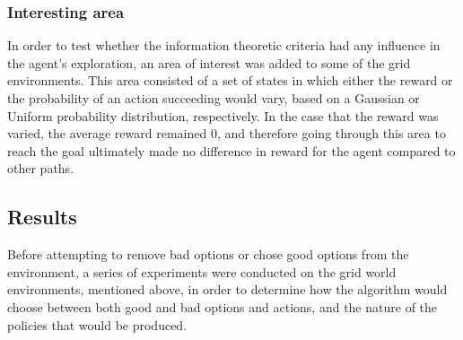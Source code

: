 \documentclass{acm_proc_article-sp}
\begin{document}


\subsubsection{Interesting area}

In order to test whether the information theoretic criteria had any influence in the agent's exploration, an area of interest was added to some of the grid environments. This area consisted of a set of states in which either the reward or the probability of an action succeeding would vary, based on a Gaussian or Uniform probability distribution, respectively. In the case that the reward was varied, the average reward remained 0, and therefore going through this area to reach the goal ultimately made no difference in reward for the agent compared to other paths.


\subsection{Results}

Before attempting to remove bad options or chose good options from the environment, a series of experiments were conducted on the grid world environments, mentioned above, in order to determine how the algorithm would choose between both good and bad options and actions, and the nature of the policies that would be produced.
\end{document}

